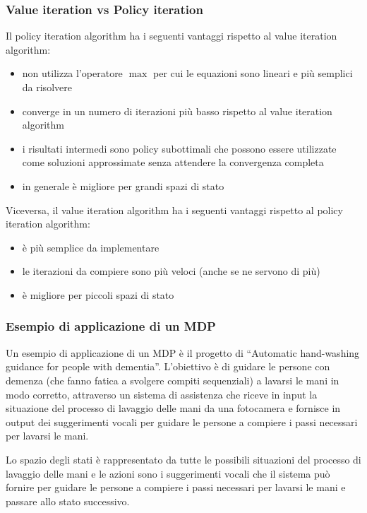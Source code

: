 \subsubsection*{Value iteration vs Policy iteration}
Il policy iteration algorithm ha i seguenti vantaggi rispetto al value iteration algorithm:
\begin{itemize}
	\item non utilizza l'operatore \(\max\) per cui le equazioni sono lineari e più semplici da risolvere
	\item converge in un numero di iterazioni più basso rispetto al value iteration algorithm
	\item i risultati intermedi sono policy subottimali che possono essere utilizzate come soluzioni approssimate
	senza attendere la convergenza completa
	\item in generale è migliore per grandi spazi di stato
\end{itemize}
Viceversa, il value iteration algorithm ha i seguenti vantaggi rispetto al policy iteration algorithm:
\begin{itemize}
	\item è più semplice da implementare
	\item le iterazioni da compiere sono più veloci (anche se ne servono di più)
	\item è migliore per piccoli spazi di stato
\end{itemize}

\subsubsection*{Esempio di applicazione di un MDP}
Un esempio di applicazione di un MDP è il progetto di ``Automatic hand-washing guidance for people with dementia''. L'obiettivo
è di guidare le persone con demenza (che fanno fatica a svolgere compiti sequenziali) a lavarsi le mani in modo corretto,
attraverso un sistema di assistenza che riceve in input la situazione del processo di lavaggio delle mani da una fotocamera
e fornisce in output dei suggerimenti vocali per guidare le persone a compiere i passi necessari per lavarsi le mani.

Lo spazio degli stati è rappresentato da tutte le possibili situazioni del processo di lavaggio delle mani e le azioni
sono i suggerimenti vocali che il sistema può fornire per guidare le persone a compiere i passi necessari per lavarsi le mani
e passare allo stato successivo.

\newpage

